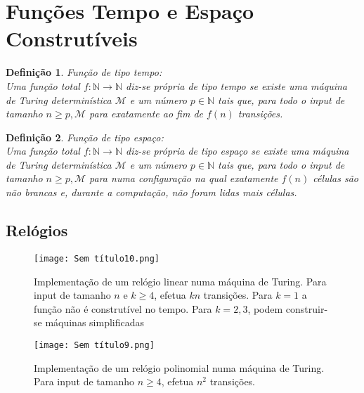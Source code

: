 \documentclass[10pt,a4paper]{report}
\newtheorem{definition}{Definição}
\begin{document}
\section{Funções Tempo e Espaço Construtíveis}
\begin{definition}
Função de tipo tempo:\\
Uma função total $f : \mathbb{N} \rightarrow \mathbb{N}$ diz-se própria de tipo tempo se existe uma máquina de Turing determinística $\mathcal{M}$ e um número $p \in \mathbb{N}$ tais que, para todo o input de tamanho $n \geq p, \mathcal{M}$ para exatamente ao fim de $f(n)$ transições.
\end{definition}
\begin{definition}
Função de tipo espaço:\\
Uma função total $f : \mathbb{N} \rightarrow \mathbb{N}$ diz-se própria de tipo espaço se existe uma máquina de Turing determinística $\mathcal{M}$ e um número $p \in \mathbb{N}$ tais que, para todo o input de tamanho $n \geq p, \mathcal{M}$ para numa configuração na qual exatamente $f(n)$ células são não brancas e, durante a computação, não foram lidas mais células.
\end{definition}
\subsection{Relógios}
\begin{figure}[H]
\centering
\texttt{[image: Sem título10.png]}
\caption{Implementação de um relógio linear numa máquina de Turing. Para input de tamanho $n$ e $k \geq 4$, efetua $kn$ transições. Para $k = 1$ a função não é construtível no tempo. Para $k = 2, 3$, podem construir-se máquinas
simplificadas}
\end{figure}
\begin{figure}[H]
\centering
\texttt{[image: Sem título9.png]}
\caption{Implementação de um relógio polinomial numa máquina de Turing. Para input de tamanho $n \geq 4$, efetua $n^2$ transições.}
\end{figure}
\end{document}
